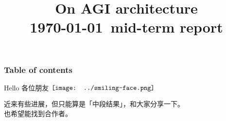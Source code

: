 \documentclass[15pt]{beamer}
\title[On AGI architecture]{\cc{\Huge《论 AGI 的架构》\\{\footnotesize \today 中期报告}}
	{On AGI architecture \\{\footnotesize \today \ mid-term report}}}
\author{\cc{YKY 甄景贤}{YKY}} %
\institute[] %
{
Independent researcher, Hong Kong \\ %
\medskip
\textit{generic.intelligence@gmail.com} %
}
\date{} %
\makeatletter
\newcommand{\cc}[2]{#1}
\newcommand{\cc}[2]{#2}
\renewcommand{\smiley}{$\vcenter{\hbox{\texttt{[image: ../smiling-face.png]}}}$}
\newif\ifframeinlbf
\newcommand\listofframes{\@starttoc{lbf}}
\makeatother
\begin{document}
\frameinlbffalse
\frame{\titlepage}

\begin{frame}
\frametitle{Table of contents}
\listofframes
\vspace*{0.5cm}
\cc{
Hello 各位朋友 \smiley

近来有些进展，但只能算是「中段结果」，和大家分享一下。 \\
也希望能找到合作者。
}{
Hello friends \smiley

I have made some intermediate progress recently, which I share below. \\
I am also looking for collaborators.
}
\end{frame}

%
%



\end{document}
